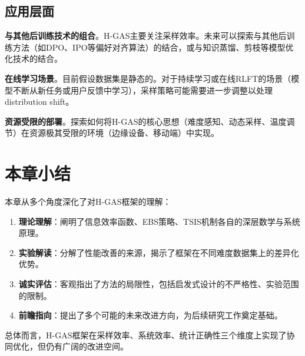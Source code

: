 \subsection{应用层面}
\label{subsec:future_application}

\textbf{与其他后训练技术的组合}。H-GAS主要关注采样效率。未来可以探索与其他后训练方法（如DPO、IPO等偏好对齐算法）的结合，或与知识蒸馏、剪枝等模型优化技术的结合。

\textbf{在线学习场景}。目前假设数据集是静态的。对于持续学习或在线RLFT的场景（模型不断从新任务或用户反馈中学习），采样策略可能需要进一步调整以处理distribution shift。

\textbf{资源受限的部署}。探索如何将H-GAS的核心思想（难度感知、动态采样、温度调节）在资源极其受限的环境（边缘设备、移动端）中实现。

\section{本章小结}
\label{sec:discussion_summary}

本章从多个角度深化了对H-GAS框架的理解：

\begin{enumerate}
    \item \textbf{理论理解}：阐明了信息效率函数、EBS策略、TSIS机制各自的深层数学与系统原理。
    \item \textbf{实验解读}：分解了性能改善的来源，揭示了框架在不同难度数据集上的差异化优势。
    \item \textbf{诚实评估}：客观指出了方法的局限性，包括启发式设计的不严格性、实验范围的限制。
    \item \textbf{前瞻指向}：提出了多个可能的未来改进方向，为后续研究工作奠定基础。
\end{enumerate}

总体而言，H-GAS框架在采样效率、系统效率、统计正确性三个维度上实现了协同优化，但仍有广阔的改进空间。
